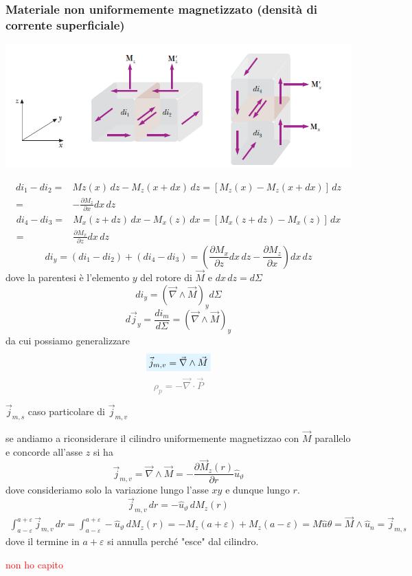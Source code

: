 \documentclass[x11names]{report}
\newcommand{\esempio}[2]{
	\begin{es}{#1}
		#2
	\end{es}
}
\newcommand{\viola}[1]{%
	\colorbox{myblue}{$\displaystyle #1$}
}
\begin{document}
\subsubsection{Materiale non uniformemente magnetizzato (densità di corrente superficiale)}
\begin{center}
	\includegraphics[scale=0.5]{img/materia_4.png}
\end{center}
\begin{align*}
	di_1 - di_2 =& Mz(x)\, dz - M_z(x+dx)\, dz = \left[M_z(x) - M_z(x+dx)\right]\, dz \\
	 =& -\frac{\partial M_z}{\partial x} dx \, dz
\end{align*}
\begin{align*}
	di_4 - di_3 =& M_x(z+dz)\, dx - M_x(z)\, dx  = \left[M_x(z+dz) - M_x(z)\right]\, dx \\
	=& \frac{\partial M_x}{\partial z} dx \, dz
\end{align*}
\[
di_y = (di_1 - di_2) + (di_4 - di_3) = \left(\frac{\partial M_x}{\partial z} dx \, dz -\frac{\partial M_z}{\partial x}\right) dx \, dz 
\]
dove la parentesi è l'elemento \(y\) del rotore di \(\vec{M}\) e \(dx \, dz = d\Sigma\)
\[
di_y = \left(\vec{\nabla} \wedge \vec{M} \right)_y d\Sigma
\]
\[
d\vec{j}_y = \frac{di_m}{d\Sigma} =  \left(\vec{\nabla} \wedge \vec{M} \right)_y 
\]
da cui possiamo generalizzare 
\begin{equation}
	\viola{\vec{j}_{m,v} =  \vec{\nabla} \wedge \vec{M} }
\end{equation}
\vspace{-0.3cm}
\textcolor{gray}{\[
	\rho_p = - \vec{\nabla}\cdot \vec{P}
	\]}
\esempio{\(\vec{j}_{m,s}\) caso particolare di \(\vec{j}_{m,v}\)}{
se andiamo a riconsiderare il cilindro uniformemente magnetizzao con \(\vec{M}\) parallelo e concorde all'asse \(z\) si ha
\[
\vec{j}_{m,v} = \vec{\nabla} \wedge \vec{M} = - \frac{\partial \vec{M}_z(r)}{\partial r}\hat{u}_\vartheta
\]
dove consideriamo solo la variazione lungo l'asse \(xy\) e dunque lungo \(r\).
\[
\vec{j}_{m,v} \, dr = - \hat{u}_\vartheta \, dM_z(r) 
\]
\begin{gather*}
	\int_{a-\varepsilon}^{a+\varepsilon} \vec{j}_{m,v} \, dr  = \int_{a-\varepsilon}^{a+\varepsilon}-\hat{u}_\vartheta \, dM_z(r) = -M_z(a+\varepsilon) + M_z(a-\varepsilon) = M\hat{u}\theta = \vec{M}\wedge\hat{u}_n = \vec{j}_{m,s}
\end{gather*}
dove il  termine in \(a+\varepsilon\) si annulla perché "esce" dal cilindro.
\begin{center}
	\textcolor{red}{non ho capito}
\end{center}}
\end{document}
